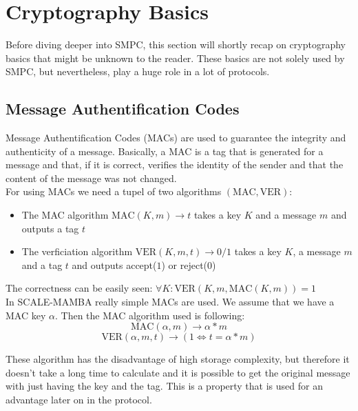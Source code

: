 \documentclass[english,runningheads,a4paper]{llncs}[2018/03/10]
\begin{document}
\section{Cryptography Basics}\label{sec:basics}

Before diving deeper into SMPC, this section will shortly recap on cryptography basics that might be unknown to the reader. These basics are not solely used by SMPC, but nevertheless, play a huge role in a lot of protocols.

\subsection{Message Authentification Codes}
Message Authentification Codes (MACs) are used to guarantee the integrity and authenticity of a message. Basically, a MAC is a tag that is generated for a message and that, if it is correct, verifies the identity of the sender and that the content of the message was not changed.\\
For using MACs we need a tupel of two algorithms \((\text{MAC},\text{VER})\):\\
\begin{itemize}
\item The MAC algorithm \(\text{MAC}(K,m)\rightarrow t\) takes a key \(K\) and a message \(m\) and outputs a tag \(t\)\\
\item The verficiation algorithm \(\text{VER}(K,m,t)\rightarrow 0/1\) takes a key \(K\), a message \(m\) and a tag \(t\) and outputs accept(\(1\)) or reject(\(0\))\\
\end{itemize}
The correctness can be easily seen: \(\forall K: \text{VER}(K,m,\text{MAC}(K,m))=1\)\\


In SCALE-MAMBA really simple MACs are used. We assume that we have a MAC key \( \alpha \). Then the MAC algorithm used is following:\\
$$\text{MAC}(\alpha,m)\rightarrow \alpha * m$$ 
$$\text{VER}(\alpha,m,t)\rightarrow (1 \Leftrightarrow t = \alpha*m) $$ 

These algorithm has the disadvantage of high storage complexity, but therefore it doesn't take a long time to calculate and it is possible to get the original message with just having the key and the tag. This is a property that is used for an advantage later on in the protocol.\\
\end{document}
